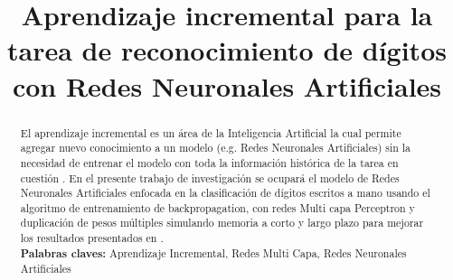 \documentclass[10pt,a4paper]{article}
\title{Aprendizaje incremental para la tarea de reconocimiento
de dígitos con Redes Neuronales Artificiales}
\begin{document}
    
    \newpage
    \tableofcontents
    \listoffigures
    \newpage
    \maketitle
    \begin{abstract}
        El aprendizaje incremental es un área de la Inteligencia Artificial la cual permite agregar nuevo conocimiento 
        a un modelo (e.g. Redes Neuronales Artificiales) sin la necesidad de entrenar el modelo con toda la información 
        histórica de la tarea en cuestión \cite{bullinaria2009}. En el presente trabajo de investigación se ocupará el modelo de Redes 
        Neuronales Artificiales enfocada en la clasificación de dígitos escritos a mano usando el algoritmo de 
        entrenamiento de backpropagation, con redes Multi capa Perceptron y duplicación de pesos múltiples 
        simulando memoria a corto y largo plazo para mejorar los resultados presentados en \cite{bullinaria2009}.\\

        \textbf{Palabras claves:} Aprendizaje Incremental, Redes Multi Capa, Redes Neuronales Artificiales
    \end{abstract}

    
    
    
    
    
    
    
    
    
    
    

    
    
\end{document}
